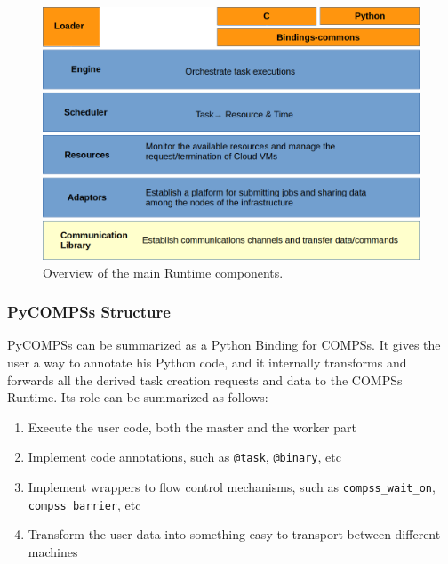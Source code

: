 \begin{figure}
\centering
\includegraphics[scale = 0.45]{figures/runtime_modules.png}
\caption{Overview of the main Runtime components.}
\label{fig:runtime_modules}
\end{figure}

\subsubsection{PyCOMPSs Structure}
\label{subsec:pycompss_structure}
PyCOMPSs can be summarized as a Python Binding for COMPSs. It gives the user a way to annotate his Python code, and it internally transforms and forwards all the derived task creation requests and data to the COMPSs Runtime. Its role can be summarized as follows:
\begin{enumerate}
\item Execute the user code, both the master and the worker part
\item Implement code annotations, such as \verb|@task|, \verb|@binary|, etc
\item Implement wrappers to flow control mechanisms, such as \verb|compss_wait_on|, \verb|compss_barrier|, etc
\item Transform the user data into something easy to transport between different machines
\end{enumerate}

